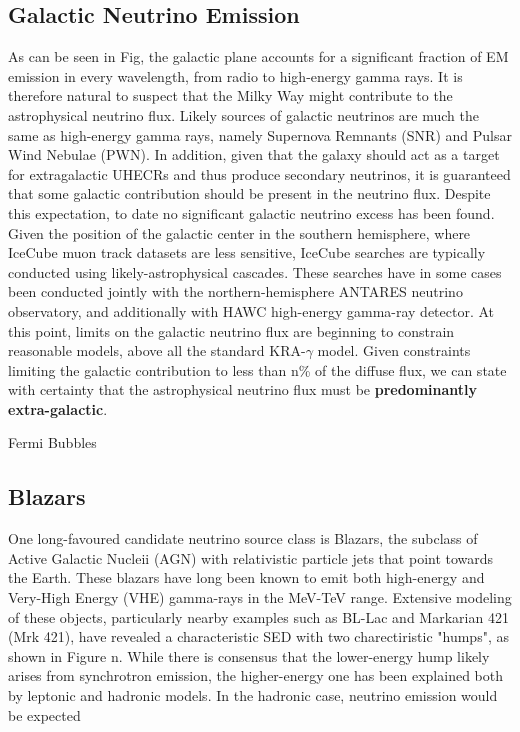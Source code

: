 \documentclass[]{article}
\begin{document}
\subsection{Galactic Neutrino Emission}

As can be seen in Fig, the galactic plane accounts for a significant fraction of EM emission in every wavelength, from radio to high-energy gamma rays. It is therefore natural to suspect that the Milky Way might contribute to the astrophysical neutrino flux. Likely sources of galactic neutrinos are much the same as high-energy gamma rays, namely Supernova Remnants (SNR) and Pulsar Wind Nebulae (PWN). In addition, given that the galaxy should act as a target for extragalactic UHECRs and thus produce secondary neutrinos, it is guaranteed that some galactic contribution should be present in the neutrino flux. Despite this expectation, to date no significant galactic neutrino excess has been found. Given the position of the galactic center in the southern hemisphere, where IceCube muon track datasets are less sensitive, IceCube searches are typically conducted using likely-astrophysical cascades. These searches have in some cases been conducted jointly with the northern-hemisphere ANTARES neutrino observatory, and additionally with HAWC high-energy gamma-ray detector. At this point, limits on the galactic neutrino flux are beginning to constrain reasonable models, above all the standard KRA-$\gamma$ model. Given constraints limiting the galactic contribution to less than n\% of the diffuse flux, we can state with certainty that the astrophysical neutrino flux must be \textbf{predominantly extra-galactic}. 

Fermi Bubbles

\subsection{Blazars}
One long-favoured candidate neutrino source class is Blazars, the subclass of Active Galactic Nucleii (AGN) with relativistic particle jets that point towards the Earth. These blazars have long been known to emit both high-energy  and Very-High Energy (VHE) gamma-rays in the MeV-TeV range. Extensive modeling of these objects, particularly nearby examples such as BL-Lac and Markarian 421 (Mrk 421), have revealed a characteristic SED with two charectiristic "humps", as shown in Figure n. While there is consensus that the lower-energy hump likely arises from synchrotron emission,  the higher-energy one has been explained both by leptonic and hadronic models. In the hadronic case, neutrino emission would be expected 
\end{document}
